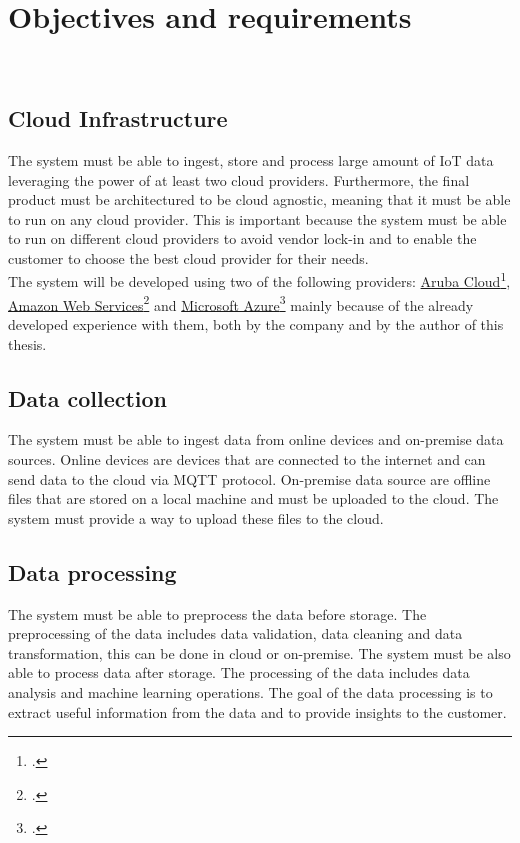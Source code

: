 \chapter{Objectives and requirements}
\label{cap:requirements}
\\

\section{Cloud Infrastructure}
The system must be able to ingest, store and process large amount of IoT data leveraging the power of at least two cloud providers. Furthermore, the final product must be architectured to be cloud agnostic, meaning that it must be able to run on any cloud provider. This is important because the system must be able to run on different cloud providers to avoid vendor lock-in and to enable the customer to choose the best cloud provider for their needs.\\
The system will be developed using two of the following providers: \href{https://www.arubacloud.com/}{Aruba Cloud}\footcite{site:aruba-cloud}, \href{https://aws.amazon.com/it/}{Amazon Web Services}\footcite{site:aws} and \href{https://azure.microsoft.com/it-it/}{Microsoft Azure}\footcite{site:azure} mainly because of the already developed
experience with them, both by the company and by the author of this thesis.

\section{Data collection}
The system must be able to ingest data from online devices and on-premise data sources. 
Online devices are devices that are connected to the internet and can send data to the cloud via MQTT protocol.
On-premise data source are offline files that are stored on a local machine and must be uploaded to the cloud. The system must provide a way to upload these files to the cloud.
\section{Data processing}
The system must be able to preprocess the data before storage. The preprocessing of the data includes data validation, data cleaning and data transformation, this can be done in cloud or on-premise. The system must be also able to process data after storage. The processing of the data includes data analysis and machine learning operations. The goal of the data processing is to extract useful information from the data and to provide insights to the customer.\\ 

